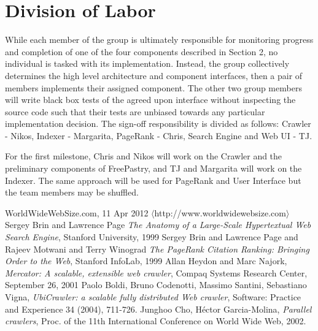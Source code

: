 \documentclass[11pt, letterpaper, oneside, twocolumn]{article}
\begin{document}
\section{ Division of Labor }
\label{sec:labor}

While each member of the group is ultimately responsible for monitoring progress and completion of one of the four components described in Section 2, no individual is tasked with its implementation.  Instead, the group collectively determines the high level architecture and component interfaces, then a pair of members implements their assigned component.  The other two group members will write black box tests of the agreed upon interface without inspecting the source code such that their tests are unbiased towards any particular implementation decision. The sign-off responsibility is divided as follows: Crawler - Nikos, Indexer - Margarita, PageRank - Chris, Search Engine and Web UI - TJ.

For the first milestone, Chris and Nikos will work on the Crawler and the preliminary components of FreePastry, and TJ and Margarita will work on the Indexer. The same approach will be used for PageRank and User Interface but the team members may be shuffled.

\begin{thebibliography}{9}

   WorldWideWebSize.com, 11 Apr 2012 $\langle$http://www.worldwidewebsize.com$\rangle$
   Sergey Brin and Lawrence Page \emph{The Anatomy of a Large-Scale Hypertextual Web Search Engine}, Stanford University, 1999
   Sergey Brin and  Lawrence Page and Rajeev Motwani and Terry Winograd \emph{The PageRank Citation Ranking: Bringing Order to the Web}, Stanford InfoLab, 1999
   Allan Heydon and Marc Najork, \emph{Mercator: A scalable, extensible web crawler}, Compaq Systems Research Center, September 26, 2001
   Paolo Boldi, Bruno Codenotti, Massimo Santini, Sebastiano Vigna, \emph{UbiCrawler: a scalable fully distributed Web crawler}, Software: Practice and Experience 34 (2004), 711-726.
   Junghoo Cho, Héctor Garcia-Molina, \emph{Parallel crawlers}, Proc. of the 11th International Conference on World Wide Web, 2002.


\end{thebibliography}
\end{document}
